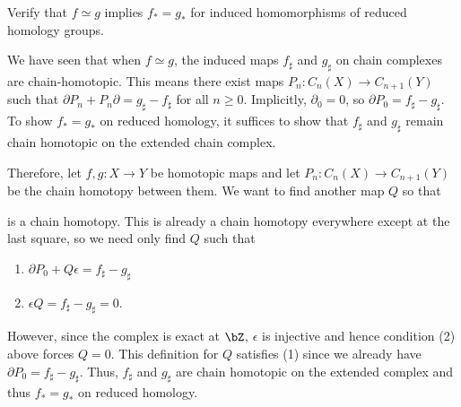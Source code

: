 \begin{homework}[e]
\begin{prf}
  \end{prf}
  \prob[2.1.13] Verify that $f \simeq g$ implies $f_* = g_*$ for induced homomorphisms of reduced homology groups.
  \begin{prf}
    We have seen that when $f\simeq g$, the induced maps $f_\sharp$ and $g_\sharp$ on chain complexes are chain-homotopic. This means there exist maps $P_n:C_n(X) \to C_{n+1}(Y)$ such that $\partial P_n + P_n \partial = g_\sharp - f_\sharp$ for all $n\geq 0$. Implicitly, $\partial_0 = 0$, so $\partial P_0 = f_\sharp - g_\sharp$. To show $f_* = g_*$ on reduced homology, it suffices to show that $f_\sharp$ and $g_\sharp$ remain chain homotopic on the extended chain complex.

    Therefore, let $f,g:X\to Y$ be homotopic maps and let $P_n:C_n(X) \to C_{n+1}(Y)$ be the chain homotopy between them. We want to find another map $Q$ so that
    \begin{center}
    \end{center}
    is a chain homotopy. This is already a chain homotopy everywhere except at the last square, so we need only find $Q$ such that
    \begin{enumerate}[(1)]
      \item $\partial P_0 + Q \epsilon = f_\sharp - g_\sharp$
      \item $\epsilon Q = f_\sharp - g_\sharp = 0$.
    \end{enumerate}
    However, since the complex is exact at $\bZ$, $\epsilon$ is injective and hence condition (2) above forces $Q = 0$. This definition for $Q$ satisfies (1) since we already have $\partial P_0 = f_\sharp - g_\sharp$. Thus, $f_\sharp$ and $g_\sharp$ are chain homotopic on the extended complex and thus $f_* = g_*$ on reduced homology.
  \end{prf} 
\end{homework}

